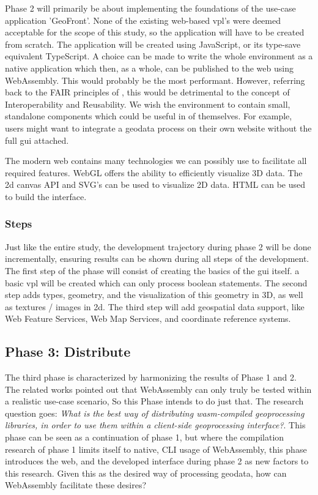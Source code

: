 Phase 2 will primarily be about implementing the foundations of the use-case application 'GeoFront'. None of the existing web-based \ac{vpl}'s were deemed acceptable for the scope of this study, so the application will have to be created from scratch. 
The application will be created using JavaScript, or its type-save equivalent TypeScript. 
A choice can be made to write the whole environment as a native application which then, as a whole, can be published to the web using WebAssembly. 
This would probably be the most performant. 
However, referring back to the FAIR principles of \cite{mark_d_wilkinson_fair_2016}, this would be detrimental to the concept of Interoperability and Reusability. 
We wish the environment to contain small, standalone components which could be useful in of themselves. 
For example, users might want to integrate a geodata process on their own website without the full \ac{gui} attached.

The modern web contains many technologies we can possibly use to facilitate all required features. WebGL offers the ability to efficiently visualize 3D data. The 2d canvas API and SVG's can be used to visualize 2D data. HTML can be used to build the interface.

\subsubsection*{Steps}

Just like the entire study, the development trajectory during phase 2 will be done incrementally, ensuring results can be shown during all steps of the development. 
The first step of the phase will consist of creating the basics of the \ac{gui} itself. a basic \ac{vpl} will be created which can only process boolean statements. The second step adds types, geometry, and the visualization of this geometry in 3D, as well as textures / images in 2d. The third step will add geospatial data support, like Web Feature Services, Web Map Services, and coordinate reference systems.  


\subsection{Phase 3: Distribute}



The third phase is characterized by harmonizing the results of Phase 1 and 2. 
The related works pointed out that WebAssembly can only truly be tested within a realistic use-case scenario, So this Phase intends to do just that.
The research question goes: \textit{What is the best way of distributing wasm-compiled geoprocessing libraries, in order to use them within a client-side geoprocessing interface?}. 
This phase can be seen as a continuation of phase 1, but where the compilation research of phase 1 limits itself to native, CLI usage of WebAssembly, this phase introduces the web, and the developed interface during phase 2 as new factors to this research. Given this as the desired way of processing geodata, how can WebAssembly facilitate these desires? 

